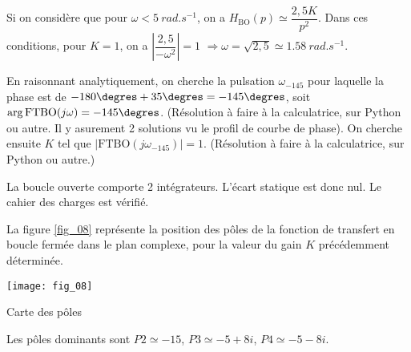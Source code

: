 \fi

\ifprof
\begin{corrige}
Si on considère que pour $\omega<\SI{5}{rad.s^{-1}}$, on a   $H_{\text{BO}}(p)\simeq \dfrac{2,5 K}{p^2}$. Dans ces conditions, pour $K=1$, on a 
$\left|\dfrac{2,5 }{-\omega^2}\right|=1$ 
$\Rightarrow \omega= \sqrt{2,5}\simeq \SI{1,58}{rad.s^{-1}} $.

\end{corrige}
\else
\fi


\ifprof
\begin{corrige}
En raisonnant analytiquement, on cherche la pulsation $\omega_{-145}$ pour laquelle la phase est de $-180\degres+35\degres = -145\degres$, soit $\arg{\text{FTBO}(j\omega)}=-145\degres$. (Résolution à faire à la calculatrice, sur Python ou autre. Il y asurement 2 solutions vu le profil de courbe de phase). 
On cherche ensuite $K$ tel que $\left| \text{FTBO}(j\omega_{-145}) \right| = 1$. 
(Résolution à faire à la calculatrice, sur Python ou autre.)
\end{corrige}
\else
\fi

\ifprof
\begin{corrige}
La boucle ouverte comporte 2 intégrateurs. L'écart statique est donc nul. Le cahier des charges est vérifié. 

\end{corrige}
\else
\fi

\ifprof
\else

La figure \ref{fig_08} représente la position des pôles de la fonction de transfert en boucle fermée dans le plan
complexe, pour la valeur du gain $K$ précédemment déterminée.


\begin{marginfigure}[-12cm]
\texttt{[image: fig\_08]}
\caption{Carte des pôles \label{fig_08}}
\end{marginfigure}
\fi


\ifprof
\begin{corrige}
Les pôles dominants sont $P2\simeq -15$, $P3 \simeq -5 +8i$, $P4\simeq -5 -8i$. 
\end{corrige}
\else
\fi


